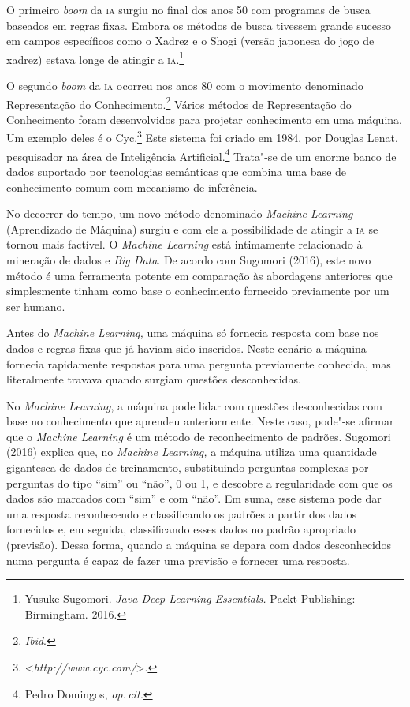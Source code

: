O primeiro \emph{boom} da \textsc{ia} surgiu no final dos anos 50 com programas
de busca baseados em regras fixas. Embora os métodos de busca tivessem
grande sucesso em campos específicos como o Xadrez e o Shogi (versão
japonesa do jogo de xadrez) estava longe de atingir a \textsc{ia}.\footnote{Yusuke Sugomori. \emph{Java Deep Learning Essentials.} Packt
Publishing: Birmingham. 2016.}

O segundo \emph{boom} da \textsc{ia} ocorreu nos anos 80 com o movimento
denominado Representação do Conhecimento.\footnote{\textit{Ibid}.} Vários
métodos de Representação do Conhecimento foram desenvolvidos para
projetar conhecimento em uma máquina. Um exemplo deles é o Cyc.\footnote{\textless{}\emph{http://www.cyc.com/}\textgreater{}.}
Este sistema foi criado em 1984, por Douglas Lenat, pesquisador na área
de Inteligência Artificial.\footnote{Pedro Domingos, \textit{op.\,cit.}}
Trata"-se de um enorme banco
de dados suportado por tecnologias semânticas que combina uma base de
conhecimento comum com mecanismo de inferência.

No decorrer do tempo, um novo método denominado \emph{Machine Learning}
(Aprendizado de Máquina) surgiu e com ele a possibilidade de atingir a
\textsc{ia} se tornou mais factível. O \emph{Machine Learning} está intimamente
relacionado à mineração de dados e \emph{Big Data}. De acordo com
Sugomori (2016), este novo método é uma ferramenta potente em comparação
às abordagens anteriores que simplesmente tinham como base o
conhecimento fornecido previamente por um ser humano.

Antes do \emph{Machine Learning,} uma máquina só fornecia resposta com
base nos dados e regras fixas que já haviam sido inseridos. Neste
cenário a máquina fornecia rapidamente respostas para uma pergunta
previamente conhecida, mas literalmente travava quando surgiam questões
desconhecidas.

No \emph{Machine Learning}, a máquina pode lidar com questões
desconhecidas com base no conhecimento que aprendeu anteriormente. Neste
caso, pode"-se afirmar que o \emph{Machine Learning} é um método de
reconhecimento de padrões. Sugomori (2016) explica que, no \emph{Machine
Learning,} a máquina utiliza uma quantidade gigantesca de dados de
treinamento, substituindo perguntas complexas por perguntas do tipo
``sim'' ou ``não'', 0 ou 1, e descobre a regularidade com que os dados
são marcados com ``sim'' e com ``não''. Em suma, esse sistema pode dar
uma resposta reconhecendo e classificando os padrões a partir dos dados
fornecidos e, em seguida, classificando esses dados no padrão apropriado
(previsão). Dessa forma, quando a máquina se depara com dados
desconhecidos numa pergunta é capaz de fazer uma previsão e fornecer uma
resposta.

